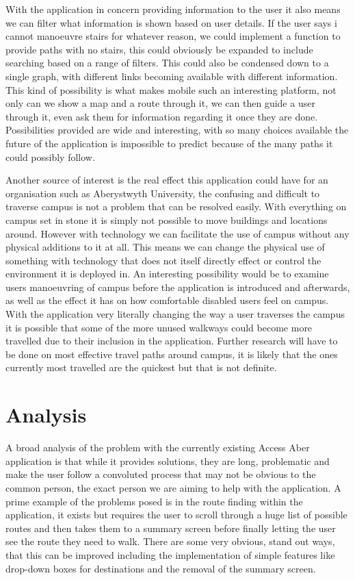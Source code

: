 With the application in concern providing information to the user it also means we can filter what information is shown based on user details. If the user says i cannot manoeuvre stairs for whatever reason, we could implement a function to provide paths with no stairs, this could obviously be expanded to include searching based on a range of filters. This could also be condensed down to a single graph, with different links becoming available with different information. This kind of possibility is what makes mobile such an interesting platform, not only can we show a map and a route through it, we can then guide a user through it, even ask them for information regarding it once they are done. Possibilities provided are wide and interesting, with so many choices available the future of the application is impossible to predict because of the many paths it could possibly follow.

Another source of interest is the real effect this application could have for an organisation such as Aberystwyth University, the confusing and difficult to traverse campus is not a problem that can be resolved easily. With everything on campus set in stone it is simply not possible to move buildings and locations around. However with technology we can facilitate the use of campus without any physical additions to it at all. This means we can change the physical use of something with technology that does not itself directly effect or control the environment it is deployed in. An interesting possibility would be to examine users manoeuvring of campus before the application is introduced and afterwards, as well as the effect it has on how comfortable disabled users feel on campus. With the application very literally changing the way a user traverses the campus it is possible that some of the more unused walkways could become more travelled due to their inclusion in the application. Further research will have to be done on most effective travel paths around campus, it is likely that the ones currently most travelled are the quickest but that is not definite. 
\section{Analysis}
A broad analysis of the problem with the currently existing Access Aber application is that while it provides solutions, they are long, problematic and make the user follow a convoluted process that may not be obvious to the common person, the exact person we are aiming to help with the application. A prime example of the problems posed is in the route finding within the application, it exists but requires the user to scroll through a huge list of possible routes and then takes them to a summary screen before finally letting the user see the route they need to walk. There are some very obvious, stand out ways, that this can be improved including the implementation of simple features like drop-down boxes for destinations and the removal of the summary screen. 

